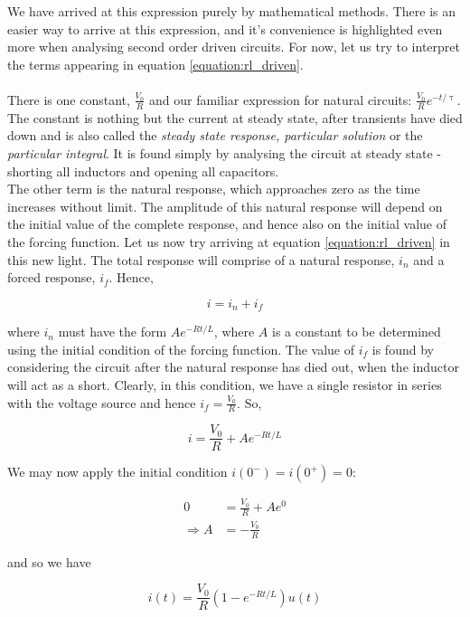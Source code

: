 \documentclass[11pt]{article}
\numberwithin{equation}{section}
\begin{document}
\begin{flushleft}
We have arrived at this expression purely by mathematical methods. There is an easier way to arrive at this expression, and it's convenience
is highlighted even more when analysing second order driven circuits. For now, let us try to interpret the terms appearing in equation
\ref{equation:rl_driven}.\\~\\
There is one constant, $\frac{V_0}{R}$ and our familiar expression for natural circuits: $\frac{V_0}{R}e^{-t/\uptau}$. The constant is nothing
but the current at steady state, after transients have died down and is also called the \textit{steady state response, particular solution} or the
\textit{particular integral}. It is found simply by analysing the circuit at steady state - shorting all inductors and opening all capacitors.\\
The other term is the natural response, which approaches zero as the time increases without limit. The amplitude of this natural response
will depend on the initial value of the complete response, and hence also on the initial value of the forcing function. Let us now try
arriving at equation \ref{equation:rl_driven} in this new light. The total response will comprise of a natural response, $i_n$ and a forced
response, $i_f$. Hence, 

\begin{equation*}
i = i_n + i_f
\end{equation*}

where $i_n$ must have the form $Ae^{-Rt/L}$, where $A$ is a constant to be determined using the initial condition of the forcing function. The value
of $i_f$ is found by considering the circuit after the natural response has died out, when the inductor will act as a short. Clearly, in this 
condition, we have a single resistor in series with the voltage source and hence $i_f = \frac{V_0}{R}$. So,

\begin{equation*}
i = \frac{V_0}{R} + Ae^{-Rt/L}
\end{equation*}

We may now apply the initial condition $i(0^-)=i(0^+)=0$:

\begin{align*}
0 &= \frac{V_0}{R} + Ae^{0}\\
\Rightarrow A &= -\frac{V_0}{R}
\end{align*}
 
 and so we have 
 
\begin{equation*}
i(t) = \frac{V_0}{R}(1-e^{-Rt/L})u(t)
\end{equation*}
 

\end{flushleft}
\end{document}
